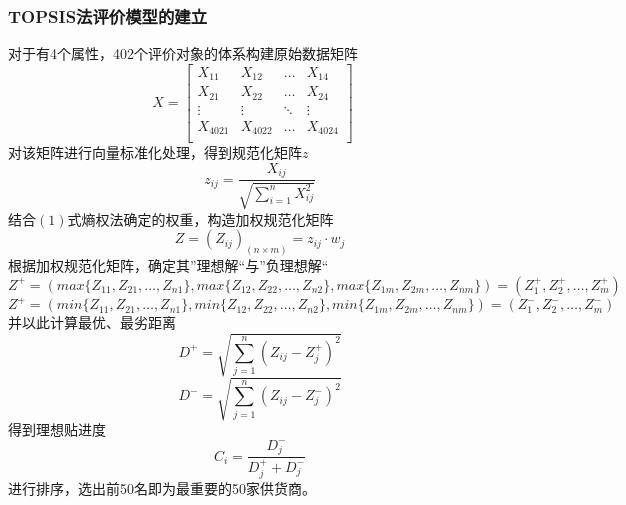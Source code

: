 \documentclass[withoutpreface,bwprint]{cumcmthesis}
\begin{document}
\subsubsection*{TOPSIS法评价模型的建立}
对于有4个属性，402个评价对象的体系构建原始数据矩阵
\begin{equation}
    X=\begin{bmatrix}
        X_{11}   & X_{12}   & \dots  & X_{14}   \\
        X_{21}   & X_{22}   & \dots  & X_{24}   \\
        \vdots   & \vdots   & \ddots & \vdots   \\
        X_{4021} & X_{4022} & \dots  & X_{4024} \\
    \end{bmatrix} \quad
    \nonumber
    \label{数据矩阵}
\end{equation}
对该矩阵进行向量标准化处理，得到规范化矩阵$z$
\begin{equation}
    z_{ij}=\frac{X_{ij}}{\sqrt{\sum\limits^n_{i=1}X^2_{ij}}}\nonumber
    \label{规范化矩阵}
\end{equation}
结合$(1)$式熵权法确定的权重，构造加权规范化矩阵
\begin{equation}
    Z=(Z_{ij})_{(n\times m)}=z_{ij}\cdot w_j\nonumber
    \label{加权规范化矩阵}
\end{equation}
根据加权规范化矩阵，确定其”理想解“与”负理想解“
\begin{equation}
    Z^+ = (max\{Z_{11},Z{_21},\dots,Z_{n1}\},max\{Z_{12},Z_{22},\dots,Z_{n2}\},max\{Z_{1m},Z_{2m},\dots,Z_{nm}\}) =(Z^+_1,Z^+_2,\dots,Z^+_m)\nonumber
\end{equation}
\begin{equation}
    Z^+ = (min\{Z_{11},Z{_21},\dots,Z_{n1}\},min\{Z_{12},Z_{22},\dots,Z_{n2}\},min\{Z_{1m},Z_{2m},\dots,Z_{nm}\}) =(Z^-_1,Z^-_2,\dots,Z^-_m)\nonumber
\end{equation}
并以此计算最优、最劣距离
\begin{equation}
    D^+=\sqrt{\sum_{j=1}^{n}{(Z_{ij}-Z^+_j)^2}}\nonumber
\end{equation}
\begin{equation}
    D^-=\sqrt{\sum_{j=1}^{n}{(Z_{ij}-Z^-_j)^2}}\nonumber
\end{equation}
得到理想贴进度
\begin{equation}
    C_i=\frac{D^-_j}{D^+_j+D^-_j}\nonumber
\end{equation}
进行排序，选出前50名即为最重要的50家供货商。
\end{document}
